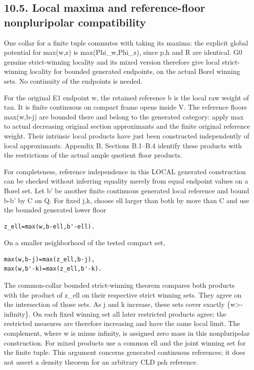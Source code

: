 \documentclass[
  10pt,
]{article}
\begin{document}
\subsection{10.5. Local maxima and reference-floor nonpluripolar
compatibility}\label{local-maxima-and-reference-floor-nonpluripolar-compatibility}

One collar for a finite tuple commutes with taking its maxima: the
explicit global potential for max(w,z) is max(Phi\_w,Phi\_z), since p,h
and R are identical. G0 genuine strict-winning locality and its mixed
version therefore give local strict-winning locality for bounded
generated endpoints, on the actual Borel winning sets. No continuity of
the endpoints is needed.

For the original E1 endpoint w, the retained reference b is the local
raw weight of tau. It is finite continuous on compact frame opens inside
V. The reference floors max(w,b-j) are bounded there and belong to the
generated category: apply max to actual decreasing original section
approximants and the finite original reference weight. Their intrinsic
local products have just been constructed independently of local
approximants. Appendix B, Sections B.1--B.4 identify these products with
the restrictions of the actual ample quotient floor products.

For completeness, reference independence in this LOCAL generated
construction can be checked without inferring equality merely from equal
endpoint values on a Borel set. Let b' be another finite continuous
generated local reference and bound \textbar b-b'\textbar{} by C on Q.
For fixed j,k, choose ell larger than both by more than C and use the
bounded generated lower floor

\begin{verbatim}
z_ell=max(w,b-ell,b'-ell).
\end{verbatim}

On a smaller neighborhood of the tested compact set,

\begin{verbatim}
max(w,b-j)=max(z_ell,b-j),
max(w,b'-k)=max(z_ell,b'-k).
\end{verbatim}

The common-collar bounded strict-winning theorem compares both products
with the product of z\_ell on their respective strict winning sets. They
agree on the intersection of those sets. As j and k increase, these sets
cover exactly \{w\textgreater-infinity\}. On each fixed winning set all
later restricted products agree; the restricted measures are therefore
increasing and have the same local limit. The complement, where w is
minus infinity, is assigned zero mass in this nonpluripolar
construction. For mixed products use a common ell and the joint winning
set for the finite tuple. This argument concerns generated continuous
references; it does not assert a density theorem for an arbitrary CLD
psh reference.
\end{document}
